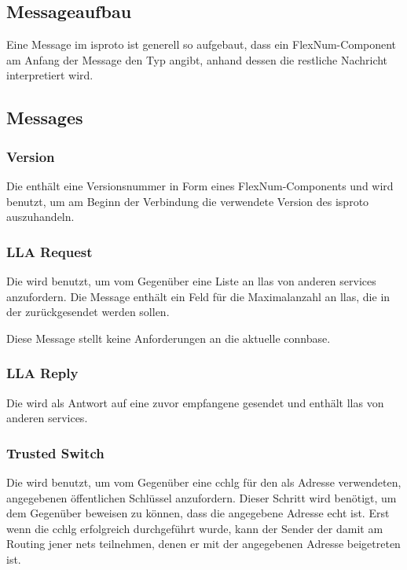 \subsection{Messageaufbau}
Eine Message im \gls{isproto} ist generell so aufgebaut, dass ein FlexNum-Component am Anfang der
Message den Typ angibt, anhand dessen die restliche Nachricht interpretiert wird.

\isprotobytefield

\subsection{Messages}

\subsubsection{Version}
\label{dcl-isproto-version}
Die \msg{\isprotoversion} enthält eine Versionsnummer in Form eines FlexNum-Components und wird
benutzt, um am Beginn der Verbindung die verwendete Version des \gls{isproto} auszuhandeln.

\isprotoversionbytefield

\subsubsection{LLA Request}
\label{dcl-isproto-llareq}
Die \msg{\isprotollareq} wird benutzt, um vom Gegenüber eine Liste an \glspl{lla} von anderen
\glspl{service} anzufordern.
Die Message enthält ein Feld für die Maximalanzahl an \glspl{lla}, die in der
\msg{\isprotollarep} zurückgesendet werden sollen.

Diese Message stellt keine Anforderungen an die aktuelle \gls{connbase}.

\isprotollareqbytefield


\subsubsection{LLA Reply}
\label{dcl-isproto-llarep}
Die \msg{\isprotollarep} wird als Antwort auf eine zuvor empfangene \msg{\isprotollareq} gesendet
und enthält \glspl{lla} von anderen \glspl{service}.

\isprotollarepbytefield


\subsubsection{Trusted Switch}
\label{dcl-isproto-ts}
Die \msg{\isprotots} wird benutzt, um vom Gegenüber eine \gls{cchlg} für den als Adresse verwendeten,
angegebenen öffentlichen Schlüssel anzufordern. Dieser Schritt wird benötigt, um dem Gegenüber beweisen
zu können, dass die angegebene Adresse echt ist. Erst wenn die \gls{cchlg} erfolgreich durchgeführt
wurde, kann der Sender der \msg{\isprotots} damit am Routing jener \glspl{net} teilnehmen, denen er
mit der angegebenen Adresse beigetreten ist.

